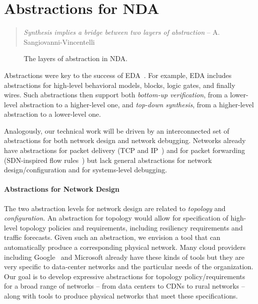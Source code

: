 \section{Abstractions for NDA}
\label{sec:abstractions}

\begin{quote}
{\em Synthesis implies a bridge between two layers of abstraction} -- A. Sangiovanni-Vincentelli~\cite{alberto}
\vspace{-2mm}
\end{quote}

\begin{figure}[t]
\centerline{
}
\caption{\label{fig:abstractions} The layers of abstraction in NDA.}
\vspace{-5mm}
\end{figure}

Abstractions were key to the success of EDA~\cite{malik}. For example, EDA includes abstractions for high-level behavioral models, blocks, logic gates, and finally wires.  Such abstractions then support both {\em bottom-up verification}, from a lower-level abstraction to a higher-level one, and {\em top-down synthesis}, from a higher-level abstraction to a lower-level one.  

Analogously, our technical work will be driven by an interconnected set of abstractions for both network design and network debugging.
Networks already have
abstractions for packet delivery (TCP and IP~\cite{kurose}) and for
packet forwarding (SDN-inspired flow
rules~\cite{Ethane,4DControlPlane,shenker-abstractions}) but lack general abstractions for network design/configuration and for systems-level debugging.

\paragraph*{Abstractions for Network Design}
%
The two abstraction levels for network design are related to {\em topology} and {\em configuration}. An abstraction for topology would allow for specification of high-level topology policies and requirements, including resiliency requirements and traffic forecasts.  Given such an abstraction, we envision a tool that can automatically produce a corresponding physical network. Many cloud providers including Google~\cite{condor} and Microsoft already have these kinds of tools but they are very specific to data-center networks and the particular needs of the organization.  Our goal is to develop expressive abstractions for topology policy/requirements for a broad range of networks -- from data centers to CDNs to rural networks -- along with tools to produce physical networks that meet these specifications.

